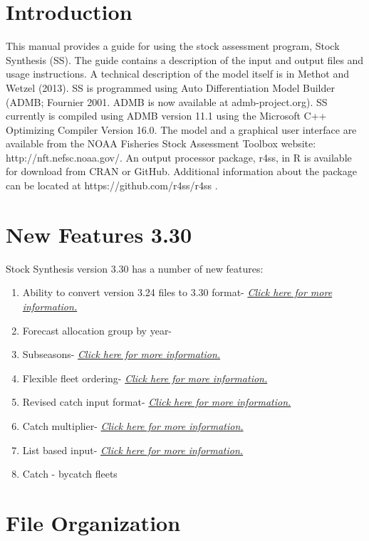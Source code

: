 
 \section{Introduction}\label{sec:intro}
	This manual provides a guide for using the stock assessment program, Stock Synthesis (SS).  The guide contains a description of the input and output files and usage instructions. A technical description of the model itself is in Methot and Wetzel (2013).  SS is programmed using Auto Differentiation Model Builder (ADMB; Fournier 2001.  ADMB is now available at admb-project.org).  SS currently is compiled using ADMB version 11.1 using the Microsoft C++ Optimizing Compiler Version 16.0.  The model and a graphical user interface are available from the NOAA Fisheries Stock Assessment Toolbox website:  http://nft.nefsc.noaa.gov/.  An output processor package, r4ss, in R is available for download from CRAN or GitHub.   Additional information about the package can be located at https://github.com/r4ss/r4ss .
	
\section{New Features 3.30}
		Stock Synthesis version 3.30 has a number of new features:
		\begin{enumerate}
			\item Ability to convert version 3.24 files to 3.30 format- \hyperlink{Convert}{\textit{Click here for more information.}}
			\item Forecast allocation group by year-
			\item Subseasons- \hyperlink{SubSeas}{\textit{Click here for more information.}}
			\item Flexible fleet ordering- \hyperlink{FleetOrder}{\textit{Click here for more information.}}
			\item Revised catch input format- \hyperlink{CatchFormat}{\textit{Click here for more information.}}
			\item Catch multiplier- \hyperlink{CatchMult}{\textit{Click here for more information.}}
			\item List based input- \hyperlink{ListBased}{\textit{Click here for more information.}}
			\item Catch - bycatch fleets
		\end{enumerate}
		
\section{File Organization}		
